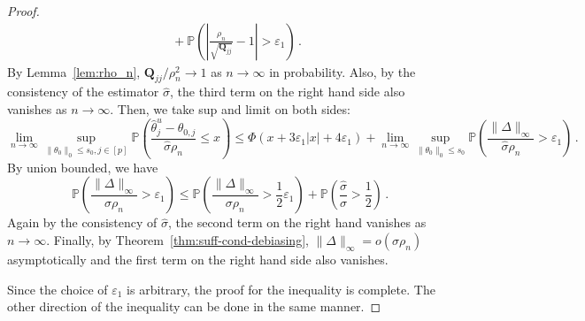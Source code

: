 \documentclass[11pt]{article}
\newcommand{\bQ}{\boldsymbol{Q}}
\newcommand{\Prob}{\mathbb{P}}
\newcommand{\hth}{\widehat{\theta}}
\begin{document}
\begin{proof}
\begin{align*}
        &\;+\Prob\left(\left|\frac{\rho_n}{\sqrt{\bQ_{jj}}}-1\right|>\varepsilon_1\right)\,.
    \end{align*}
    By Lemma~\ref{lem:rho_n}, $\bQ_{jj}/\rho_n^2\to1$ as $n\to\infty$ in probability. Also, by the consistency of the estimator $\widehat{\sigma}$, the third term on the right hand side also vanishes as $n\to\infty$. Then, we take sup and limit on both sides:
    \[
    \lim_{n\to\infty}\sup_{\|\theta_0\|_0\leq s_0,j\in[p]}\Prob\left(\frac{\hth^u_j-\theta_{0,j}}{\widehat{\sigma}\rho_n}\leq x\right) \leq\Phi(x+3\varepsilon_1|x|+4\varepsilon_1)+\lim_{n\to\infty}\sup_{\|\theta_0\|_0\leq s_0}\Prob\left(\frac{\|\Delta\|_\infty}{\widehat{\sigma}\rho_n}>\varepsilon_1\right)\,.
    \]
    By union bounded, we have
    \[
    \Prob\left(\frac{\|\Delta\|_\infty}{\widehat{\sigma}\rho_n}>\varepsilon_1\right)\leq\Prob\left(\frac{\|\Delta\|_\infty}{\sigma\rho_n}>\frac{1}{2}\varepsilon_1\right)+\Prob\left(\frac{\widehat{\sigma}}{\sigma}>\frac{1}{2}\right)\,.
    \]
    Again by the consistency of $\widehat{\sigma}$, the second term on the right hand vanishes as $n\to\infty$. Finally, by Theorem~\ref{thm:suff-cond-debiasing}, $\|\Delta\|_\infty=o(\sigma\rho_n)$ asymptotically and the first term on the right hand side also vanishes.

    Since the choice of $\varepsilon_1$ is arbitrary, the proof for the inequality is complete. The other direction of the inequality can be done in the same manner.
\end{proof}
\end{document}
